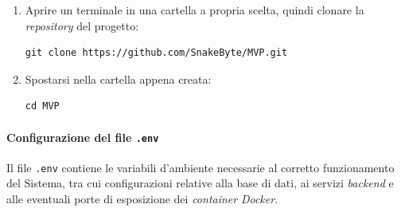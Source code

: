 \documentclass[10pt, letterpaper]{article}
\begin{document}
\begin{enumerate}
    \item Aprire un terminale in una cartella a propria scelta, quindi clonare 
    la \textit{repository} del progetto:
\begin{verbatim}
git clone https://github.com/SnakeByte/MVP.git
\end{verbatim}
    \item Spostarsi nella cartella appena creata:
\begin{verbatim}
cd MVP
\end{verbatim}
\end{enumerate}

\paragraph{Configurazione del file \texttt{.env}}
Il file \texttt{.env} contiene le variabili d'ambiente necessarie al corretto funzionamento del Sistema, 
tra cui configurazioni relative alla base di dati, ai servizi \textit{backend} e alle eventuali porte di esposizione dei \textit{container} \textit{Docker}.
\end{document}
